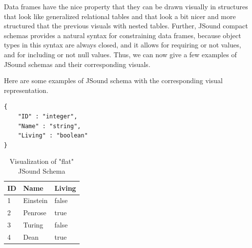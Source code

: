 Data frames have the nice property that they can be drawn visually in structures that look like generalized relational tables and that look a bit nicer and more structured that the previous visuals with nested tables. Further, JSound compact schemas provides a natural syntax for constraining data frames, because object types in this syntax are always closed, and it allows for requiring or not values, and for including or not null values. Thus, we can now give a few examples of JSound schemas and their corresponding visuals.

Here are some examples of JSound schema with the corresponding visual representation.

\begin{minipage}{0.45\textwidth}
\vspace{1\baselineskip}
\begin{lstlisting}[style=json,caption={"flat" JSound Schema}]
{
    "ID" : "integer",
    "Name" : "string",
    "Living" : "boolean"
}      
\end{lstlisting}
\end{minipage}
\hfill
\begin{minipage}{0.45\textwidth}
\begin{table}[H]
    \centering
    \begin{tabular}{|l|l|l|}
        \hline ID & Name & Living \\
        \hline 1 & Einstein & false \\
        \hline 2 & Penrose & true \\
        \hline 3 & Turing & false \\
        \hline 4 & Dean & true \\
        \hline
    \end{tabular}
    \caption{Visualization of "flat" JSound Schema}
\end{table}
\end{minipage}

